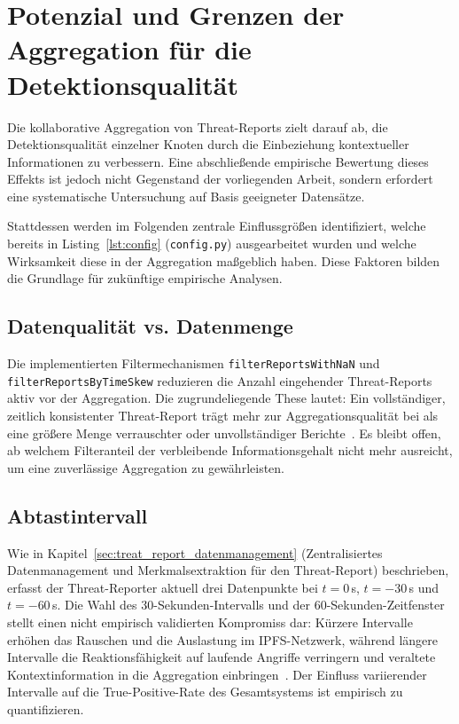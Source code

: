 \section{Potenzial und Grenzen der Aggregation für die Detektionsqualität}

Die kollaborative Aggregation von Threat-Reports zielt darauf ab, die Detektionsqualität einzelner Knoten durch die Einbeziehung kontextueller Informationen zu verbessern. Eine abschließende empirische Bewertung dieses Effekts ist jedoch nicht Gegenstand der vorliegenden Arbeit, sondern erfordert eine systematische Untersuchung auf Basis geeigneter Datensätze.

Stattdessen werden im Folgenden zentrale Einflussgrößen identifiziert, welche bereits in Listing~\ref{lst:config} (\texttt{config.py}) ausgearbeitet wurden und welche Wirksamkeit diese in der Aggregation maßgeblich haben. Diese Faktoren bilden die Grundlage für zukünftige empirische Analysen.

\subsection{Datenqualität vs. Datenmenge}
Die implementierten Filtermechanismen \texttt{filterReportsWithNaN} und\\\texttt{filterReportsByTimeSkew} reduzieren die Anzahl eingehender Threat-Reports aktiv vor der Aggregation. Die zugrundeliegende These lautet: Ein vollständiger, zeitlich konsistenter Threat-Report trägt mehr zur Aggregationsqualität bei als eine größere Menge verrauschter oder unvollständiger Berichte~\cite{hasan2021missingvalue}. Es bleibt offen, ab welchem Filteranteil der verbleibende Informationsgehalt nicht mehr ausreicht, um eine zuverlässige Aggregation zu gewährleisten.

\subsection{Abtastintervall}
Wie in Kapitel~\ref{sec:treat_report_datenmanagement} (Zentralisiertes Datenmanagement und Merkmalsextraktion für den Threat-Report) beschrieben, erfasst der Threat-Reporter aktuell drei Datenpunkte bei $t = 0$\,s, $t = -30$\,s und $t = -60$\,s. Die Wahl des 30-Sekunden-Intervalls und der 60-Sekunden-Zeitfenster stellt einen nicht empirisch validierten Kompromiss dar: Kürzere Intervalle erhöhen das Rauschen und die Auslastung im IPFS-Netzwerk, während längere Intervalle die Reaktionsfähigkeit auf laufende Angriffe verringern und veraltete Kontextinformation in die Aggregation einbringen~\cite{zhang2019iacf, heigl2021exploiting}. Der Einfluss variierender Intervalle auf die True-Positive-Rate des Gesamtsystems ist empirisch zu quantifizieren.

